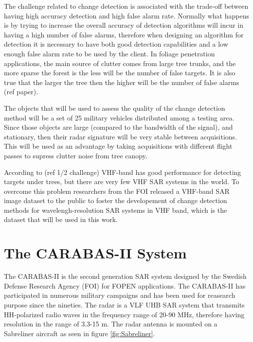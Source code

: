 The challenge related to change detection is associated with the trade-off between having high accuracy detection and high false alarm rate.
Normally what happens is by trying to increase the overall accuracy of detection algorithms will incur in having a high number of false alarms, 
therefore when designing an algorithm for detection it is necessary to have both good detection capabilities and a low enough false alarm rate
to be used by the client. In foliage penetration applications, the main source of clutter comes from large tree trunks, and the more sparse the
forest is the less will be the number of false targets. It is also true that the larger the tree then the higher will be the number of false alarms (ref paper).

The objects that will be used to assess the quality of the change detection method will be a set of 25 military vehicles distributed among a testing area.
Since those objects are large (compared to the bandwidth of the signal), and stationary, then their radar signature will be very stable between acquisitions.
This will be used as an advantage by taking acquisitions with different flight passes to supress clutter noise from tree canopy.

According to (ref 1/2 challenge) VHF-band has good performance for detecting targets under trees, but there are very few VHF SAR systems in the world.
To overcome this problem researchers from the FOI released a VHF-band SAR image dataset to the public to foster the developement of 
change detection methods for wavelengh-resolution SAR systems in VHF band, which is the dataset that will be used in this work.


\section{The CARABAS-II System}

The CARABAS-II is the second generation SAR system designed by the Swedish Defense Research Agency (FOI) for FOPEN applications.
The CARABAS-II has participated in numerous military campaigns and has been used for reasearch purpose since the nineties.
The radar is a VLF UHB SAR system that transmits HH-polarized radio waves in the frequency range of 
20-90 MHz, therefore having resolution in the range of 3.3-15 m. The radar antenna is mounted on a Sabreliner aircraft as seen in figure \ref{fig:Sabreliner}.

